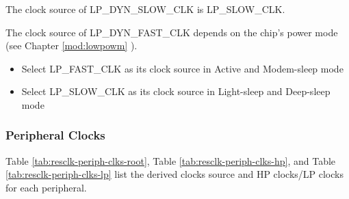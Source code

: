 \documentclass[main\_\_EN.tex]{subfiles}
\begin{document}
The clock source of LP\_DYN\_SLOW\_CLK is LP\_SLOW\_CLK.

The clock source of LP\_DYN\_FAST\_CLK depends on the chip's power mode (see Chapter \ref{mod:lowpowm} \textit{}).
\begin{itemize}
    \item Select LP\_FAST\_CLK as its clock source in Active and Modem-sleep mode
    \item Select LP\_SLOW\_CLK as its clock source in Light-sleep and Deep-sleep mode
\end{itemize}

\subsubsection{Peripheral Clocks}
Table \ref{tab:resclk-periph-clks-root}, Table \ref{tab:resclk-periph-clks-hp}, and Table \ref{tab:resclk-periph-clks-lp} list the derived clocks source and HP clocks/LP clocks for each peripheral.
\end{document}
